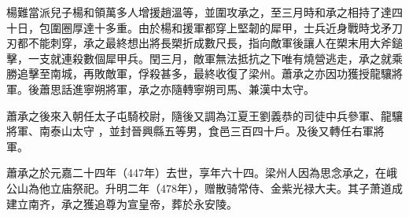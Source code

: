楊難當派兒子楊和領萬多人增援趙溫等，並圍攻承之，至三月時和承之相持了達四十日，包圍圈厚達十多重。由於楊和援軍都穿上堅韌的犀甲，士兵近身戰時戈矛刀刃都不能刺穿，承之最終想出將長槊折成數尺長，指向敵軍後讓人在槊末用大斧鎚擊，一支就連殺數個犀甲兵。閏三月，敵軍無法抵抗之下唯有燒營逃走，承之就乘勝追擊至南城，再敗敵軍，俘殺甚多，最終收復了梁州。蕭承之亦因功獲授龍驤將軍。後蕭思話進寧朔將軍，承之亦隨轉寧朔司馬、兼漢中太守。

蕭承之後來入朝任太子屯騎校尉，隨後又調為江夏王劉義恭的司徒中兵參軍、龍驤將軍、南泰山太守 ，並封晉興縣五等男，食邑三百四十戶。及後又轉任右軍將軍。

蕭承之於元嘉二十四年（447年）去世，享年六十四。梁州人因為思念承之，在峨公山為他立庙祭祀。升明二年（478年），赠散骑常侍、金紫光禄大夫。其子萧道成建立南齐，承之獲追尊为宣皇帝，葬於永安陵。










